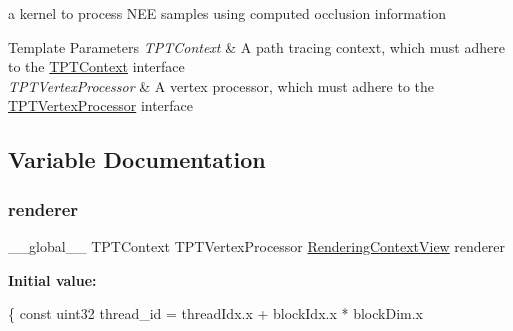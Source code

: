 a kernel to process N\+EE samples using computed occlusion information


\begin{DoxyTemplParams}{Template Parameters}
{\em T\+P\+T\+Context} & A path tracing context, which must adhere to the \hyperlink{_p_t_lib_page_TPTContext}{T\+P\+T\+Context} interface \\
\hline
{\em T\+P\+T\+Vertex\+Processor} & A vertex processor, which must adhere to the \hyperlink{_p_t_lib_page_TPTVertexProcessor}{T\+P\+T\+Vertex\+Processor} interface \\
\hline
\end{DoxyTemplParams}


\subsection{Variable Documentation}
\mbox{\label{group___p_t_lib_gae95d7c96b9ac2c50c31658f8dcee372c}} 
\subsubsection{\texorpdfstring{renderer}{renderer}}
{\footnotesize\ttfamily \+\_\+\+\_\+global\+\_\+\+\_\+ T\+P\+T\+Context T\+P\+T\+Vertex\+Processor \hyperlink{struct_rendering_context_view}{Rendering\+Context\+View} renderer}

{\bfseries Initial value\+:}
\begin{DoxyCode}
\{
    \textcolor{keyword}{const} uint32 thread\_id = threadIdx.x + blockIdx.x * blockDim.x
\end{DoxyCode}
